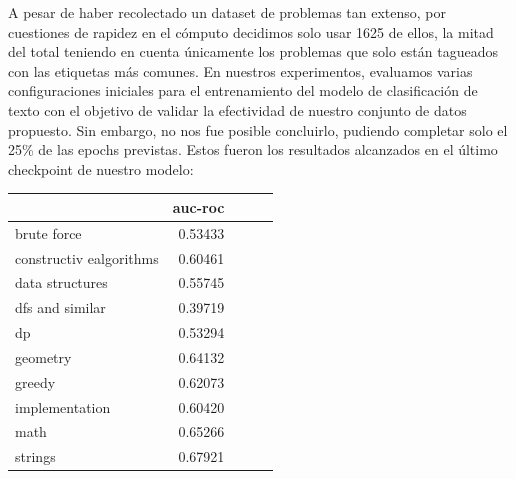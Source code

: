\documentclass{article}
\begin{document}
    A pesar de haber recolectado un dataset de problemas tan extenso, por cuestiones de 
    rapidez en el cómputo decidimos solo usar 1625 de ellos, la mitad 
    del total teniendo en cuenta únicamente los problemas que solo están 
    tagueados con las etiquetas más comunes. En nuestros experimentos, evaluamos varias configuraciones 
    iniciales para el entrenamiento del modelo de clasificación de texto con el objetivo de 
    validar la efectividad de nuestro conjunto de datos propuesto. Sin embargo, no nos fue posible 
    concluirlo, pudiendo completar solo el 25\% de las epochs previstas. Estos fueron los resultados 
    alcanzados en el último checkpoint de nuestro modelo:

    \begin{tabular}{lrrrr}
        \toprule
        {}                      & auc-roc  \\
        \midrule
        brute force             & 0.53433  \\
        constructiv ealgorithms & 0.60461  \\
        data structures         & 0.55745  \\
        dfs and similar         & 0.39719  \\
        dp                      & 0.53294  \\
        geometry                & 0.64132  \\
        greedy                  & 0.62073  \\
        implementation          & 0.60420  \\
        math                    & 0.65266  \\
        strings                 & 0.67921  \\
        \bottomrule
    \end{tabular}
\end{document}
